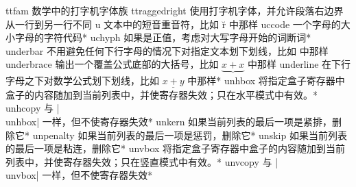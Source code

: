 \capcs ttfam {数学中的打字机字体族}{}{}
\capcs ttraggedright {使用打字机字体，并允许段落右边界从一行到另一行不同}{}{}
%
\capcs u {文本中的短音重音符，比如 \u r 中那样}{}{}
\capcs uccode {一个字母的大小字母的字符代码}*{}
\capcs uchyph {如果是正值，考虑对大写字母开始的词断词}*{}
\capcs underbar {不用避免任何下行字母的情况下对指定文本划下划线，比如  中那样}{}{}
\capcs underbrace {输出一个覆盖公式底部的大括号，比如 $\underbrace{x+x}{}$ 中那样}{}{}
\capcs underline {在下行字母之下对数学公式划下划线，比如 $\underline{x+y}$ 中那样}*{}
\capcs unhbox {将指定盒子寄存器中盒子的内容随加到当前列表中，并使寄存器失效；只在水平模式中有效。}*{}
\capcs unhcopy {与 |\\unhbox| 一样，但不使寄存器失效}*{}
\capcs unkern {如果当前列表的最后一项是紧排，删除它}*{}
\capcs unpenalty {如果当前列表的最后一项是惩罚，删除它}*{}
\capcs unskip {如果当前列表的最后一项是粘连，删除它}*{}
\capcs unvbox {将指定盒子寄存器中盒子的内容随加到当前列表中，并使寄存器失效；只在竖直模式中有效。}*{}
\capcs unvcopy {与 |\\unvbox| 一样，但不使寄存器失效}*{}
